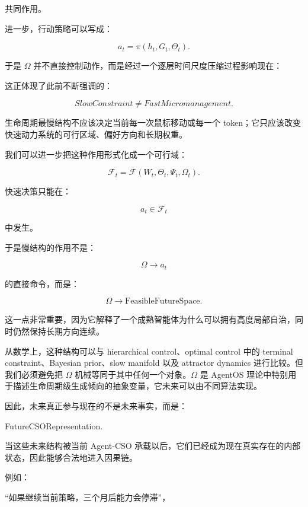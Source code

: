 共同作用。

进一步，行动策略可以写成：

\[
a_t
=
\pi
\left(
h_t,
G_t,
\Theta_t
\right).
\]

于是 $\Omega$ 并不直接控制动作，而是经过一个逐层时间尺度压缩过程影响现在：

\begin{statementbox}
\centering
{}
\end{statementbox}

这正体现了此前不断强调的：

\[
\boxed{
SlowConstraint
\neq
FastMicromanagement.
}
\]

生命周期最慢结构不应该决定当前每一次鼠标移动或每一个 token；它只应该改变快速动力系统的可行区域、偏好方向和长期权重。

我们可以进一步把这种作用形式化成一个可行域：

\[
\mathcal{F}_t
=
\mathcal{F}
\left(
W_t,
\Theta_t,
\Psi_t,
\Omega_t
\right).
\]

快速决策只能在：

\[
a_t\in\mathcal{F}_t
\]

中发生。

于是慢结构的作用不是：

\[
\Omega\to a_t
\]

的直接命令，而是：

\[
\boxed{
\Omega
\to
\text{FeasibleFutureSpace}.
}
\]

这一点非常重要，因为它解释了一个成熟智能体为什么可以拥有高度局部自治，同时仍然保持长期方向连续。

从数学上，这种结构可以与 hierarchical control、optimal control 中的 terminal constraint、Bayesian prior、slow manifold 以及 attractor dynamics 进行比较。但我们必须避免把 $\Omega$ 机械等同于其中任何一个对象。$\Omega$ 是 AgentOS 理论中特别用于描述生命周期级生成倾向的抽象变量，它未来可以由不同算法实现。

因此，未来真正参与现在的不是未来事实，而是：

\begin{statementbox}
FutureCSORepresentation.
\end{statementbox}

当这些未来结构被当前 Agent-CSO 承载以后，它们已经成为现在真实存在的内部状态，因此能够合法地进入因果链。

例如：

“如果继续当前策略，三个月后能力会停滞”，

